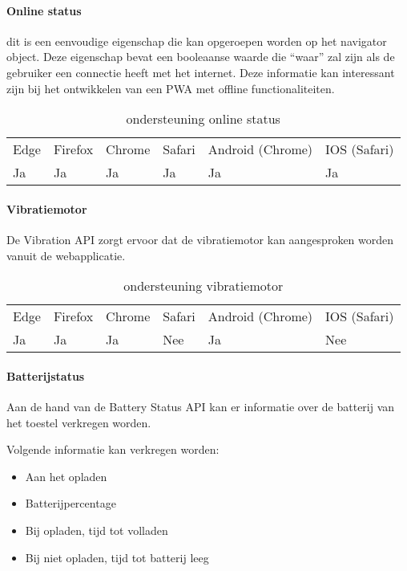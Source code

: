 \paragraph{Online status}

dit is een eenvoudige eigenschap die kan opgeroepen worden op het navigator object. Deze eigenschap bevat een booleaanse waarde die “waar” zal zijn als de gebruiker een connectie heeft met het internet. Deze informatie kan interessant zijn bij het ontwikkelen van een PWA met offline functionaliteiten.
\begin{table}[]
	\begin{tabular}{llllll}
		Edge & Firefox & Chrome & Safari & Android (Chrome) & IOS (Safari) \\
		Ja   & Ja      &  Ja     & Ja     & Ja               & Ja          
	\end{tabular}	
	\caption{ondersteuning online status }
	\label{ondersteuning online status}
\end{table}

\paragraph{Vibratiemotor }

De Vibration API \autocite{Kostionen2020} zorgt ervoor dat de vibratiemotor kan aangesproken worden vanuit de webapplicatie.

\begin{table}[]
	\begin{tabular}{llllll}
		Edge & Firefox & Chrome & Safari & Android (Chrome) & IOS (Safari) \\
		Ja   & Ja      &  Ja     & Nee     & Ja               & Nee          
	\end{tabular}	
	\caption{ondersteuning vibratiemotor  }
	\label{ondersteuning vibratiemotor  }
\end{table}


\paragraph{Batterijstatus}

Aan de hand van de Battery Status API \autocite{Kostiainen2020} kan er informatie over de batterij van het toestel verkregen worden.

Volgende informatie kan verkregen worden:
 \begin{itemize}
	\item	Aan het opladen
	\item	Batterijpercentage
	\item	Bij opladen, tijd tot volladen
	\item	Bij niet opladen, tijd tot batterij leeg
\end{itemize}

